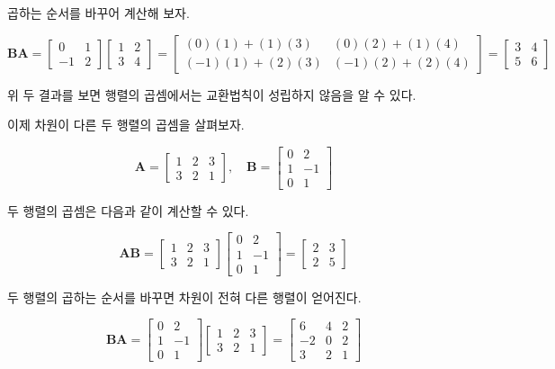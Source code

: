 \documentclass[
  11pt,
  a4paper,
  oneside]{scrbook}
\theoremstyle{definition}
\theoremstyle{plain}
\theoremstyle{definition}
\theoremstyle{definition}
\theoremstyle{remark}
\begin{document}
곱하는 순서를 바꾸어 계산해 보자.

\[
\pmb B \pmb A =
\begin{bmatrix}
0 & 1 \\
-1 & 2
\end{bmatrix}
\begin{bmatrix}
1 & 2 \\
3 & 4 
\end{bmatrix}
=
\begin{bmatrix}
(0)(1) + (1)(3) & (0)(2) + (1)(4) \\
(-1)(1) + (2)(3) & (-1)(2) + (2)(4)
\end{bmatrix}
=
\begin{bmatrix}
3 & 4 \\
5 & 6
\end{bmatrix}
\]

위 두 결과를 보면 행렬의 곱셈에서는 교환법칙이 성립하지 않음을 알 수
있다.

이제 차원이 다른 두 행렬의 곱셈을 살펴보자.

\[
\pmb A =
\begin{bmatrix}
1 & 2 & 3\\
3 & 2 & 1
\end{bmatrix},
\quad
\pmb B =
\begin{bmatrix}
0 & 2 \\
1 & -1 \\
0 & 1
\end{bmatrix}
\]

두 행렬의 곱셈은 다음과 같이 계산할 수 있다.

\[
\pmb A \pmb B =
\begin{bmatrix}
1 & 2 & 3\\
3 & 2 & 1
\end{bmatrix}
\begin{bmatrix}
0 & 2 \\
1 & -1 \\
0 & 1
\end{bmatrix}
=
\begin{bmatrix}
2 & 3 \\
2 & 5
\end{bmatrix}
\]

두 행렬의 곱하는 순서를 바꾸면 차원이 전혀 다른 행렬이 얻어진다.

\[
\pmb B \pmb A =
\begin{bmatrix}
0 & 2 \\
1 & -1 \\
0 & 1
\end{bmatrix}
\begin{bmatrix}
1 & 2 & 3\\
3 & 2 & 1
\end{bmatrix}
=
\begin{bmatrix}
6 & 4 & 2 \\
-2 & 0 & 2 \\
3 & 2 & 1
\end{bmatrix}
\]
\end{document}

